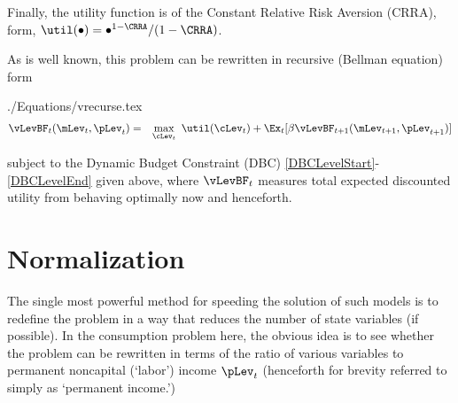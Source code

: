 \documentclass[titlepage]{\econtex}
\begin{document}
Finally, the utility function is of the
Constant Relative Risk Aversion (CRRA), form, $\util(\bullet) = \bullet^{1-\CRRA}/(1-\CRRA)$.

As is well known, this problem can be rewritten in recursive (Bellman equation) form
\begin{verbatimwrite}{./Equations/vrecurse.tex}
  \begin{eqnarray}
    \vLevBF_{t}(\mLev_{t},\pLev_{t}) & = & \max_{\cLev_{t}}~ \util(\cLev_{t}) + \Ex_{t}[{\DiscAlt} \vLevBF_{t+1}({\mLev}_{t+1},\pLev_{t+1})]\label{eq:vrecurse}
  \end{eqnarray}
\end{verbatimwrite}

subject to the Dynamic Budget Constraint (DBC) \eqref{DBCLevelStart}-\eqref{DBCLevelEnd} given above, where $\vLevBF_{t}$
measures total expected discounted utility from behaving optimally now
and henceforth.%

\hypertarget{Normalization}{}
\section{Normalization}\label{sec:normalization}
 The single most powerful method for speeding
the solution of such models is to redefine
the problem in a way that reduces the number of state variables (if
possible).  In the consumption problem here, the obvious idea is to see 
whether the problem can be rewritten in terms of the ratio of various
variables to permanent noncapital (`labor') income $\pLev_{t}$ (henceforth
for brevity referred to simply as `permanent income.')
\end{document}
